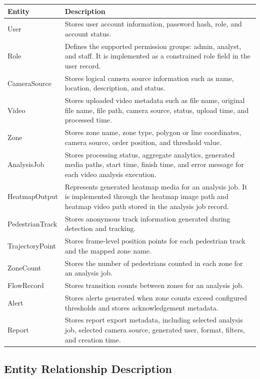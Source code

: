 \documentclass[12pt,a4paper]{report}
\begin{document}
\begin{longtable}{|p{4.0cm}|p{9.8cm}|}
\hline
\rowcolor{HeaderBlue}
\textbf{Entity} & \textbf{Description} \\
\hline
User & Stores user account information, password hash, role, and account status. \\
\hline
Role & Defines the supported permission groups: admin, analyst, and staff. It is implemented as a constrained role field in the user record. \\
\hline
CameraSource & Stores logical camera source information such as name, location, description, and status. \\
\hline
Video & Stores uploaded video metadata such as file name, original file name, file path, camera source, status, upload time, and processed time. \\
\hline
Zone & Stores zone name, zone type, polygon or line coordinates, camera source, order position, and threshold value. \\
\hline
AnalysisJob & Stores processing status, aggregate analytics, generated media paths, start time, finish time, and error message for each video analysis execution. \\
\hline
HeatmapOutput & Represents generated heatmap media for an analysis job. It is implemented through the heatmap image path and heatmap video path stored in the analysis job record. \\
\hline
PedestrianTrack & Stores anonymous track information generated during detection and tracking. \\
\hline
TrajectoryPoint & Stores frame-level position points for each pedestrian track and the mapped zone name. \\
\hline
ZoneCount & Stores the number of pedestrians counted in each zone for an analysis job. \\
\hline
FlowRecord & Stores transition counts between zones for an analysis job. \\
\hline
Alert & Stores alerts generated when zone counts exceed configured thresholds and stores acknowledgement metadata. \\
\hline
Report & Stores report export metadata, including selected analysis job, selected camera source, generated user, format, filters, and creation time. \\
\hline
\end{longtable}

\subsection*{Entity Relationship Description}
\end{document}
